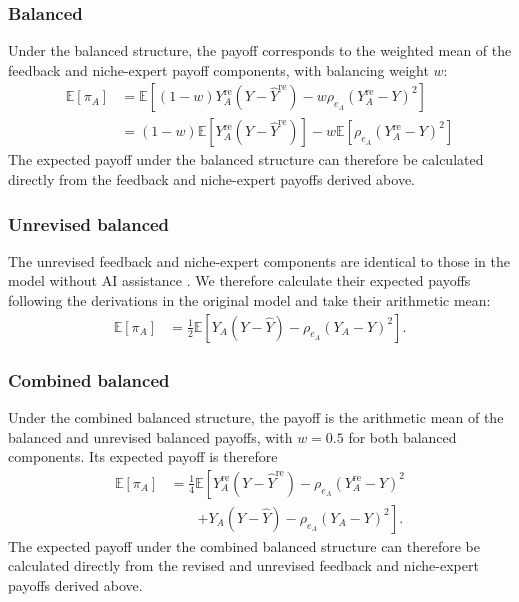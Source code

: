 \documentclass[12pt]{article}
\begin{document}
\subsubsection*{Balanced}

Under the balanced structure, the payoff corresponds to the weighted mean of the feedback and niche-expert payoff components, with balancing weight $w$:
\begin{align}
\mathbb{E}[\pi_{A}]&=\mathbb{E}\left[(1-w)Y_A^{\mathrm{re}}(Y-\hat{Y}^{\mathrm{re}}) - w\rho_{e_A}(Y_A^{\mathrm{re}}-Y)^2\right]\\
&= (1-w)\mathbb{E}\left[Y_A^{\mathrm{re}}(Y-\hat{Y}^{\mathrm{re}})\right] - w\mathbb{E}\left[\rho_{e_A}(Y_A^{\mathrm{re}}-Y)^2\right]
\end{align}
The expected payoff under the balanced structure can therefore be calculated directly from the feedback and niche-expert payoffs derived above.

\subsubsection*{Unrevised balanced}

The unrevised feedback and niche-expert components are identical to those in the model without AI assistance \citep{wang2025individual}. We therefore calculate their expected payoffs following the derivations in the original model and take their arithmetic mean:
\begin{align}
\mathbb{E}[\pi_A]
&= \frac{1}{2}\mathbb{E}\left[Y_A(Y-\hat{Y})-\rho_{e_A}(Y_A-Y)^2\right].
\end{align}

\subsubsection*{Combined balanced}

Under the combined balanced structure, the payoff is the arithmetic mean of the balanced and unrevised balanced payoffs, with $w=0.5$ for both balanced components. Its expected payoff is therefore
\begin{align}
\mathbb{E}[\pi_A]
&= \frac{1}{4}\mathbb{E}\left[
Y_A^{\mathrm{re}}(Y-\hat{Y}^{\mathrm{re}})
-\rho_{e_A}(Y_A^{\mathrm{re}}-Y)^2
\right.\\
&\qquad\left.
+Y_A(Y-\hat{Y})
-\rho_{e_A}(Y_A-Y)^2
\right].
\end{align}
The expected payoff under the combined balanced structure can therefore be calculated directly from the revised and unrevised feedback and niche-expert payoffs derived above.
\end{document}
